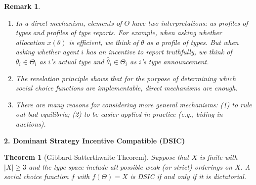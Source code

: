 \documentclass[11pt,leqno]{article}
\newtheorem{theorem}{Theorem}
\newtheorem{remark}{Remark}
\begin{document}
\begin{remark}
\hfill
\begin{enumerate}
    \item In a direct mechanism, elements of $\Theta$ have two interpretations: as profiles of types and profiles of type reports. For example, when asking whether allocation $x(\theta)$ is efficient, we think of $\theta$ as a profile of types. But when asking whether agent $i$ has an incentive to report truthfully, we think of $\theta_i \in \Theta_i$ as $i$'s actual type and $\hat{\theta}_i \in \Theta_i$ as $i$'s type announcement. 
    \item The revelation principle shows that for the purpose of determining which social choice functions are implementable, direct mechanisms are enough.
    \item There are many reasons for considering more general mechanisms: (1) to rule out bad equilibria; (2) to be easier applied in practice (e.g., biding in auctions). 
\end{enumerate}
\end{remark}


\textbf{2. Dominant Strategy Incentive Compatible (DSIC)}

\begin{theorem}[Gibbard-Satterthwaite Theorem]
Suppose that $X$ is finite with $|X|\ge 3$ and the type space include all possible weak (or strict) orderings on $X$. A social choice function $f$ with $f(\Theta)=X$ is DSIC if and only if it is dictatorial.
\end{theorem}
\end{document}
